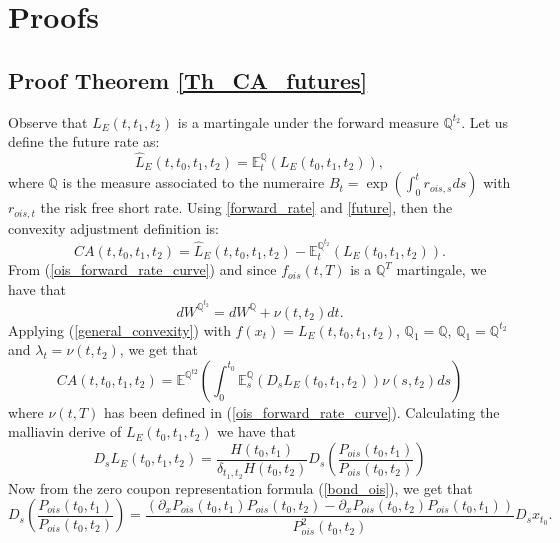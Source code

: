 \documentclass[a4paper,10pt]{article}
\newcommand{\1}{\mathbf{1}}
\begin{document}
\section{Proofs}
\subsection{Proof Theorem \ref{Th_CA_futures}}\label{Proof_CA_futures}
Observe that $L_{E}(t, t_1, t_2)$ is a martingale under the forward measure $\mathbb{Q}^{t_2}$. Let us define the future rate as:    
\begin{equation}\label{future}
\hat{L}_{E}(t,t_0, t_1, t_2) = \mathbb{E}_t^{\mathbb{Q}}\left(L_{E}(t_0, t_1, t_2) \right), 
\end{equation}
where $\mathbb{Q}$ is the measure associated to the numeraire $B_t=\exp\left(\int_{0}^{t} r_{ois, s} ds \right)$ with $ r_{ois, t}$ the risk free short rate. Using
\eqref{forward_rate} and \eqref{future}, then the convexity adjustment definition is:
\begin{equation*}
CA(t, t_0, t_1, t_2) = \hat{L}_{E}(t,t_0, t_1, t_2) - \mathbb{E}_t^{\mathbb{Q}^{t_2}}\left(L_{E}(t_0, t_1, t_2) \right).
\end{equation*}
From (\ref{ois_forward_rate_curve}) and since $f_{ois}(t,T)$ is a $\mathbb{Q}^{T}$ martingale, we have that
\begin{equation}\label{girsanov_spot_forward}
dW^{\mathbb{Q}^{t_2}} = dW^{\mathbb{Q}} + \nu(t,t_2) dt. 
\end{equation}
Applying (\ref{general_convexity}) with $f(x_t)=L_{E}(t,t_0, t_1, t_2)$, $\mathbb{Q}_1=\mathbb{Q}$, $\mathbb{Q}_1=\mathbb{Q}^{t_2}$ and $\lambda_t = \nu(t,t_2)$,  we get that
\begin{equation}\label{ca_general_future}
CA(t, t_0, t_1, t_2) = \mathbb{E}^{\mathbb{Q}^{t2}}\left(\int_{0}^{t_0} \mathbb{E}^{\mathbb{Q}}_{s}\left(D_s L_{E}(t_0,t_1,t_2) \right) \nu(s,t_2) ds \right)
\end{equation}
where $\nu(t,T)$ has been defined in (\ref{ois_forward_rate_curve}). Calculating the malliavin derive of $L_{E}(t_0,t_1,t_2)$ we have that
\begin{equation*}
D_s L_{E}(t_0,t_1,t_2) = \frac{H(t_0,t_1)}{\delta_{t_1,t_2}H(t_0,t_2)} D_s \left(\frac{P_{ois}(t_0,t_1)}{P_{ois}(t_0,t_2)}\right) 
\end{equation*}
Now from the zero coupon representation formula (\ref{bond_ois}), we get that
\begin{equation*}
D_s \left(\frac{P_{ois}(t_0,t_1)}{P_{ois}(t_0,t_2)}\right) = \frac{\left(\partial_{x}P_{ois}(t_0,t_1)P_{ois}(t_0,t_2) - \partial_{x}P_{ois}(t_0,t_2) P_{ois}(t_0,t_1) \right)}{P^{2}_{ois}(t_0,t_2)} D_s x_{t_0}.
\end{equation*}
\end{document}
